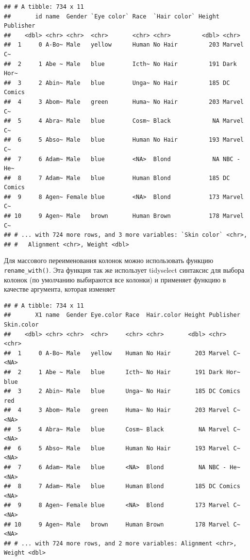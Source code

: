 \documentclass[
]{book}
\newenvironment{Shaded}{\begin{snugshade}}{\end{snugshade}}
\newcommand{\KeywordTok}[1]{\textcolor[rgb]{0.13,0.29,0.53}{\textbf{#1}}}
\newcommand{\NormalTok}[1]{#1}
\newcommand{\OperatorTok}[1]{\textcolor[rgb]{0.81,0.36,0.00}{\textbf{#1}}}
\newcommand{\StringTok}[1]{\textcolor[rgb]{0.31,0.60,0.02}{#1}}
\begin{document}
\begin{verbatim}
## # A tibble: 734 x 11
##       id name  Gender `Eye color` Race  `Hair color` Height Publisher
##    <dbl> <chr> <chr>  <chr>       <chr> <chr>         <dbl> <chr>    
##  1     0 A-Bo~ Male   yellow      Human No Hair         203 Marvel C~
##  2     1 Abe ~ Male   blue        Icth~ No Hair         191 Dark Hor~
##  3     2 Abin~ Male   blue        Unga~ No Hair         185 DC Comics
##  4     3 Abom~ Male   green       Huma~ No Hair         203 Marvel C~
##  5     4 Abra~ Male   blue        Cosm~ Black            NA Marvel C~
##  6     5 Abso~ Male   blue        Human No Hair         193 Marvel C~
##  7     6 Adam~ Male   blue        <NA>  Blond            NA NBC - He~
##  8     7 Adam~ Male   blue        Human Blond           185 DC Comics
##  9     8 Agen~ Female blue        <NA>  Blond           173 Marvel C~
## 10     9 Agen~ Male   brown       Human Brown           178 Marvel C~
## # ... with 724 more rows, and 3 more variables: `Skin color` <chr>,
## #   Alignment <chr>, Weight <dbl>
\end{verbatim}

Для массового переименования колонок можно использовать функцию \texttt{rename\_with()}. Эта функция так же использует tidyselect синтаксис для выбора колонок (по умолчанию выбираются все колонки) и применяет функцию в качестве аргумента, которая изменяет

\begin{Shaded}
\end{Shaded}

\begin{verbatim}
## # A tibble: 734 x 11
##       X1 name  Gender Eye.color Race  Hair.color Height Publisher Skin.color
##    <dbl> <chr> <chr>  <chr>     <chr> <chr>       <dbl> <chr>     <chr>     
##  1     0 A-Bo~ Male   yellow    Human No Hair       203 Marvel C~ <NA>      
##  2     1 Abe ~ Male   blue      Icth~ No Hair       191 Dark Hor~ blue      
##  3     2 Abin~ Male   blue      Unga~ No Hair       185 DC Comics red       
##  4     3 Abom~ Male   green     Huma~ No Hair       203 Marvel C~ <NA>      
##  5     4 Abra~ Male   blue      Cosm~ Black          NA Marvel C~ <NA>      
##  6     5 Abso~ Male   blue      Human No Hair       193 Marvel C~ <NA>      
##  7     6 Adam~ Male   blue      <NA>  Blond          NA NBC - He~ <NA>      
##  8     7 Adam~ Male   blue      Human Blond         185 DC Comics <NA>      
##  9     8 Agen~ Female blue      <NA>  Blond         173 Marvel C~ <NA>      
## 10     9 Agen~ Male   brown     Human Brown         178 Marvel C~ <NA>      
## # ... with 724 more rows, and 2 more variables: Alignment <chr>, Weight <dbl>
\end{verbatim}
\end{document}
